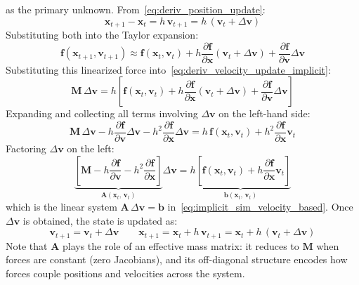 \documentclass{article}
\begin{document}
\begin{derivation}
as the primary unknown. From~\eqref{eq:deriv_position_update}:
\begin{equation*}
    \mathbf{x}_{t+1} - \mathbf{x}_t = h\,\mathbf{v}_{t+1} = h\,(\mathbf{v}_t + \Delta\mathbf{v})
\end{equation*}
Substituting both into the Taylor expansion:
\begin{equation*}
    \mathbf{f}(\mathbf{x}_{t+1}, \mathbf{v}_{t+1}) \approx
    \mathbf{f}(\mathbf{x}_t, \mathbf{v}_t)
    + h\frac{\partial \mathbf{f}}{\partial \mathbf{x}}(\mathbf{v}_t + \Delta\mathbf{v})
    + \frac{\partial \mathbf{f}}{\partial \mathbf{v}}\Delta\mathbf{v}
\end{equation*}
Substituting this linearized force into~\eqref{eq:deriv_velocity_update_implicit}:
\begin{equation*}
    \mathbf{M}\,\Delta\mathbf{v} = h\left[
    \mathbf{f}(\mathbf{x}_t, \mathbf{v}_t)
    + h\frac{\partial \mathbf{f}}{\partial \mathbf{x}}(\mathbf{v}_t + \Delta\mathbf{v})
    + \frac{\partial \mathbf{f}}{\partial \mathbf{v}}\Delta\mathbf{v}
    \right]
\end{equation*}
Expanding and collecting all terms involving $\Delta\mathbf{v}$ on the left-hand side:
\begin{equation*}
    \mathbf{M}\,\Delta\mathbf{v}
    - h\frac{\partial \mathbf{f}}{\partial \mathbf{v}}\Delta\mathbf{v}
    - h^2\frac{\partial \mathbf{f}}{\partial \mathbf{x}}\Delta\mathbf{v}
    = h\,\mathbf{f}(\mathbf{x}_t, \mathbf{v}_t)
    + h^2\frac{\partial \mathbf{f}}{\partial \mathbf{x}}\mathbf{v}_t
\end{equation*}
Factoring $\Delta\mathbf{v}$ on the left:
\begin{equation*}
    \underbrace{\left[
        \mathbf{M}
        - h\frac{\partial \mathbf{f}}{\partial \mathbf{v}}
        - h^2\frac{\partial \mathbf{f}}{\partial \mathbf{x}}
    \right]}_{\mathbf{A}(\mathbf{x}_t,\,\mathbf{v}_t)}
    \Delta\mathbf{v}
    =
    \underbrace{h\left[
        \mathbf{f}(\mathbf{x}_t, \mathbf{v}_t)
        + h\frac{\partial \mathbf{f}}{\partial \mathbf{x}}\mathbf{v}_t
    \right]}_{\mathbf{b}(\mathbf{x}_t,\,\mathbf{v}_t)}
\end{equation*}
which is the linear system $\mathbf{A}\,\Delta\mathbf{v} = \mathbf{b}$ in~\eqref{eq:implicit_sim_velocity_based}.
Once $\Delta\mathbf{v}$ is obtained, the state is updated as:
\begin{equation*}
    \mathbf{v}_{t+1} = \mathbf{v}_t + \Delta\mathbf{v}
    \qquad
    \mathbf{x}_{t+1} = \mathbf{x}_t + h\,\mathbf{v}_{t+1} = \mathbf{x}_t + h\,(\mathbf{v}_t + \Delta\mathbf{v})
\end{equation*}
Note that $\mathbf{A}$ plays the role of an effective mass matrix: it reduces to $\mathbf{M}$ when forces are constant (zero Jacobians), and its off-diagonal structure encodes how forces couple positions and velocities across the system.
\end{derivation}
\end{document}
